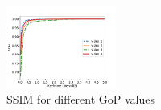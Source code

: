 \begin{figure}
\centering
\includegraphics[width=0.32\textwidth]{fig/ssim_gop.pdf}
\caption{SSIM for different GoP values}
\label{fig:ssim_gop}
\end{figure}